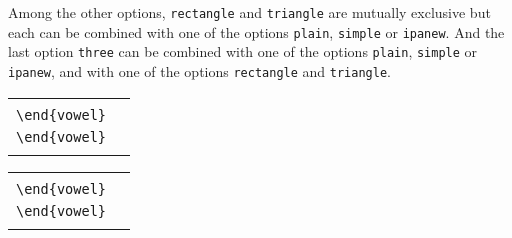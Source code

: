 \documentclass[a4paper]{article}
\begin{document}
Among the other options, \texttt{rectangle}
and \texttt{triangle} are mutually exclusive but each can be combined
with one of the options \texttt{plain}, \texttt{simple} or
\texttt{ipanew}. And the last option \texttt{three} can be combined
with one of the options \texttt{plain}, \texttt{simple} or
\texttt{ipanew}, and with one of the options \texttt{rectangle}
and \texttt{triangle}.

\begin{center}
\begin{tabular}{ll}
  \begin{minipage}[t]{5.5cm}{\small
    \verb|\begin{vowel}[rectangle]|\\
    \verb|\end{vowel}|}
  \end{minipage} &
  \begin{minipage}[t]{5.5cm}{\small
    \verb|\begin{vowel}[plain,rectangle]|\\
    \verb|\end{vowel}|}
  \end{minipage} \\
  \begin{vowel}[t,rectangle]\end{vowel} &
  \begin{vowel}\end{vowel}
\end{tabular}

\begin{tabular}{ll}
  \begin{minipage}[t]{5.5cm}{\small
    \verb|\begin{vowel}[simple,rectangle]|\\
    \verb|\end{vowel}|}
  \end{minipage} &
  \begin{minipage}[t]{5.5cm}{\small
    \verb|\begin{vowel}[triangle]|\\
    \verb|\end{vowel}|}
  \end{minipage} \\
  \begin{vowel}\end{vowel} &
  \begin{vowel}[t,triangle]\end{vowel}
\end{tabular}


\end{center}
\end{document}
